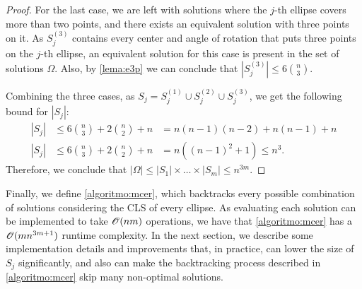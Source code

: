 \begin{proof}
	For the last case, we are left with solutions where the $j$-th ellipse covers more than two points, and there exists an equivalent solution with three points on it. 
	As $S_j^{(3)}$ contains every center and angle of rotation that puts three points on the $j$-th ellipse, an equivalent solution for this case is present in the set of solutions $\Omega$. Also, by \autoref{lema:e3p} we can conclude that $|S_j^{(3)}| \le 6\binom{n}{3}$.
	
	Combining the three cases, as $S_j=S_j^{(1)}\cup S_j^{(2)} \cup S_j^{(3)}$, we get the following bound for $|S_j|$:
	\begin{eqnarray*}
		|S_j| &\le 6\binom{n}{3} + 2\binom{n}{2} + n &= n(n-1)(n-2) + n(n-1) + n\\
		|S_j| &\le 6\binom{n}{3} + 2\binom{n}{2} + n &= n((n-1)^2+1) \le n^3.
	\end{eqnarray*}	
	Therefore, we conclude that  $|\Omega| \le |S_1|\times \dots \times |S_m| \le n^{3m}$.
\end{proof}

Finally, we define \autoref{algoritmo:mcer}, which backtracks every possible combination of solutions considering the CLS of every ellipse.
As evaluating each solution can be implemented to take $\mathscr{O}(nm)$ operations, we have that \autoref{algoritmo:mcer} has a $\mathscr{O}(mn^{3m+1})$ runtime complexity.
In the next section, we describe some implementation details and improvements that, in practice, can lower the size of $S_j$ significantly, and also can make the backtracking process described in \autoref{algoritmo:mcer} skip many non-optimal solutions.


